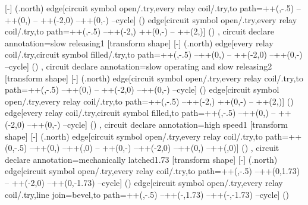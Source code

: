 {{    [-]
    (\tikzlastnode.north) edge[circuit symbol open/.try,every relay coil/.try,to path={++(\tikzcircuitssizeunit,-.5\pgflinewidth) --++(0,\tikzcircuitssizeunit) -- ++(-2\tikzcircuitssizeunit,0) --++(0,-\tikzcircuitssizeunit) --cycle}] () edge[circuit symbol open/.try,every relay coil/.try,to path={++(\tikzcircuitssizeunit,-.5\pgflinewidth) --++(-2\tikzcircuitssizeunit,\tikzcircuitssizeunit) ++(0,-\tikzcircuitssizeunit) -- ++(2\tikzcircuitssizeunit,\tikzcircuitssizeunit)}] ()
  },
  circuit declare annotation={slow releasing}{1\tikzcircuitssizeunit}
  {
    [transform shape]
    [-]
    (\tikzlastnode.north) edge[every relay coil/.try,circuit symbol filled/.try,to path={++(\tikzcircuitssizeunit,-.5\pgflinewidth)
--++(0,\tikzcircuitssizeunit) -- ++(-2\tikzcircuitssizeunit,0) --++(0,-\tikzcircuitssizeunit) --cycle}] ()
  },
  circuit declare annotation={slow operating and slow releasing}{2\tikzcircuitssizeunit}
  {
    [transform shape]
    [-]
    (\tikzlastnode.north) edge[circuit symbol open/.try,every relay coil/.try,to path={++(\tikzcircuitssizeunit,-.5\pgflinewidth) --++(0,\tikzcircuitssizeunit) -- ++(-2\tikzcircuitssizeunit,0) --++(0,-\tikzcircuitssizeunit) --cycle}] () edge[circuit symbol open/.try,every relay coil/.try,to path={++(\tikzcircuitssizeunit,-.5\pgflinewidth) --++(-2\tikzcircuitssizeunit,\tikzcircuitssizeunit) ++(0,-\tikzcircuitssizeunit) -- ++(2\tikzcircuitssizeunit,\tikzcircuitssizeunit)}] () edge[every relay coil/.try,circuit symbol filled,to path={++(\tikzcircuitssizeunit,\tikzcircuitssizeunit-.5\pgflinewidth) --++(0,\tikzcircuitssizeunit) -- ++(-2\tikzcircuitssizeunit,0) --++(0,-\tikzcircuitssizeunit) --cycle}] ()
  },
  circuit declare annotation={high speed}{1\tikzcircuitssizeunit}
  {
    [transform shape]
    [-]
    (\tikzlastnode.north) edge[circuit symbol open/.try,every relay coil/.try,to path={++(0,-.5\pgflinewidth) --++(0,\tikzcircuitssizeunit) --++(\tikzcircuitssizeunit,0) -- ++(0,-\tikzcircuitssizeunit) --++(-2\tikzcircuitssizeunit,0) --++(0,\tikzcircuitssizeunit) --++(\tikzcircuitssizeunit,0)}] ()
  },
  circuit declare annotation={mechanically latched}{1.73\tikzcircuitssizeunit}
  {
    [transform shape]
    [-]
    (\tikzlastnode.north) edge[circuit symbol open/.try,every relay coil/.try,to path={++(\tikzcircuitssizeunit,-.5\pgflinewidth) --++(0,1.73\tikzcircuitssizeunit) -- ++(-2\tikzcircuitssizeunit,0) --++(0,-1.73\tikzcircuitssizeunit) --cycle}] () edge[circuit symbol open/.try,every relay coil/.try,line join=bevel,to path={++(\tikzcircuitssizeunit,-.5\pgflinewidth) --++(-\tikzcircuitssizeunit,1.73\tikzcircuitssizeunit) --++(-\tikzcircuitssizeunit,-1.73\tikzcircuitssizeunit) --cycle}] ()
}}
